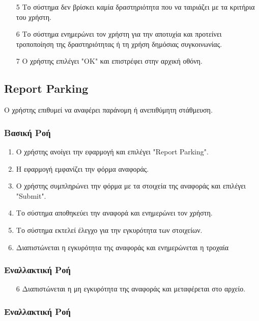\documentclass[11pt]{article}
\begin{document}
\begin{enumerate}
    \item[5] Το σύστημα δεν βρίσκει καμία δραστηριότητα που να ταιριάζει με τα
        κριτήρια του χρήστη.
    \item[6] Το σύστημα ενημερώνει τον χρήστη για την αποτυχία και προτείνει
        τροποποίηση της δραστηριότητας ή τη χρήση δημόσιας συγκοινωνίας.
    \item[7] Ο χρήστης επιλέγει "ΟΚ" και επιστρέφει στην αρχική οθόνη.
\end{enumerate}

\subsection{Report Parking}

Ο χρήστης επιθυμεί να αναφέρει παράνομη ή ανεπιθύμητη στάθμευση.

\subsubsection{Βασική Ροή}

\begin{enumerate}
    \item Ο χρήστης ανοίγει την εφαρμογή και επιλέγει "Report Parking".
    \item Η εφαρμογή εμφανίζει την φόρμα αναφοράς.
    \item Ο χρήστης συμπληρώνει την φόρμα με τα στοιχεία της αναφοράς
          και επιλέγει "Submit".
    \item Το σύστημα αποθηκεύει την αναφορά και ενημερώνει τον χρήστη.
    \item Το σύστημα εκτελεί έλεγχο για την εγκυρότητα των στοιχείων.
    \item Διαπιστώνεται η εγκυρότητα της αναφοράς και ενημερώνεται η τροχαία
\end{enumerate}

\subsubsection{Εναλλακτική Ροή}

\begin{enumerate}
    \item[6] Διαπιστώνεται η μη εγκυρότητα της αναφοράς και μεταφέρεται στο αρχείο.
\end{enumerate}

\subsubsection{Εναλλακτική Ροή}
\end{document}
